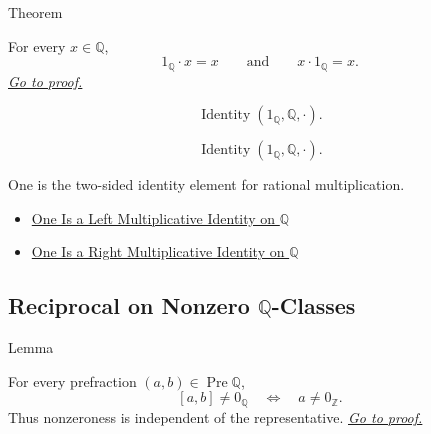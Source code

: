 \begin{theorembox}{Theorem}
\begin{theorem}
\label{thm:one-multiplicative-identity-on-q}
For every $x\in\mathbb{Q}$,
\[
1_{\mathbb{Q}}\cdot x=x
\qquad\text{and}\qquad
x\cdot 1_{\mathbb{Q}}=x.
\]
\hyperref[prf:one-multiplicative-identity-on-q]{\textit{Go to proof.}}
\end{theorem}
\end{theorembox}

\begin{remark*}
\[
\operatorname{Identity}(1_{\mathbb{Q}},\mathbb{Q},\cdot).
\]
\end{remark*}

\begin{remark*}
\[
\operatorname{Identity}(1_{\mathbb{Q}},\mathbb{Q},\cdot).
\]
\end{remark*}

\begin{remark*}[Interpretation]
One is the two-sided identity element for rational multiplication.
\end{remark*}

\begin{dependencies}
\begin{itemize}
  \item \hyperref[thm:one-left-multiplicative-identity-on-q]{One Is a Left Multiplicative Identity on $\mathbb{Q}$}
  \item \hyperref[cor:one-right-multiplicative-identity-on-q]{One Is a Right Multiplicative Identity on $\mathbb{Q}$}
\end{itemize}
\end{dependencies}

\subsection*{\texorpdfstring{Reciprocal on Nonzero $\mathbb{Q}$-Classes}{Reciprocal on Nonzero Q-Classes}}

\begin{lemmabox}{Lemma}
\begin{lemma}
\label{lem:nonzero-predicate-well-defined-q}
For every prefraction $(a,b)\in\operatorname{Pre}\mathbb{Q}$,
\[
[a,b]\ne 0_{\mathbb{Q}}
\quad\Longleftrightarrow\quad
a\ne 0_{\mathbb{Z}}.
\]
Thus nonzeroness is independent of the representative.
\hyperref[prf:nonzero-predicate-well-defined-q]{\textit{Go to proof.}}
\end{lemma}
\end{lemmabox}


